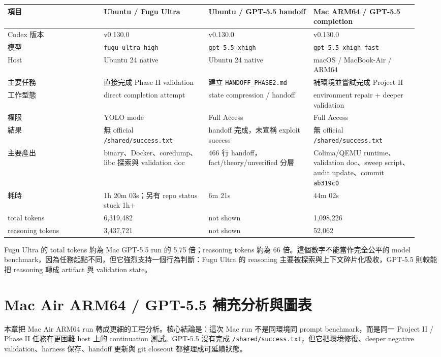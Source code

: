 \documentclass[UTF8,a4paper,11pt]{ctexart}
\newcommand{\code}[1]{\texttt{#1}}
\newcommand{\artifact}[1]{\texttt{#1}}
\begin{document}
\begin{longtable}{L{0.22\linewidth} L{0.24\linewidth} L{0.24\linewidth} L{0.24\linewidth}}
\toprule
項目 & Ubuntu / Fugu Ultra & Ubuntu / GPT-5.5 handoff & Mac ARM64 / GPT-5.5 completion\\
\midrule
Codex 版本 & v0.130.0 & v0.130.0 & v0.130.0\\
模型 & \code{fugu-ultra high} & \code{gpt-5.5 xhigh} & \code{gpt-5.5 xhigh fast}\\
Host & Ubuntu 24 native & Ubuntu 24 native & macOS / MacBook-Air / ARM64\\
主要任務 & 直接完成 Phase II validation & 建立 \artifact{HANDOFF\_PHASE2.md} & 補環境並嘗試完成 Project II\\
工作型態 & direct completion attempt & state compression / handoff & environment repair + deeper validation\\
權限 & YOLO mode & Full Access & Full Access\\
結果 & 無 official \artifact{/shared/success.txt} & handoff 完成，未宣稱 exploit success & 無 official \artifact{/shared/success.txt}\\
主要產出 & binary、Docker、coredump、libc 探索與 validation doc & 466 行 handoff，fact/theory/unverified 分層 & Colima/QEMU runtime、validation doc、sweep script、audit update、commit \code{ab319c0}\\
耗時 & 1h 20m 03s；另有 repo status stuck 1h+ & 6m 21s & 44m 02s\\
total tokens & 6,319,482 & not shown & 1,098,226\\
reasoning tokens & 3,437,721 & not shown & 52,062\\
\bottomrule
\end{longtable}

Fugu Ultra 的 total tokens 約為 Mac GPT-5.5 run 的 5.75 倍；reasoning tokens 約為 66 倍。這個數字不能當作完全公平的 model benchmark，因為任務起點不同，但它強烈支持一個行為判斷：Fugu Ultra 的 reasoning 主要被探索與上下文碎片化吸收，GPT-5.5 則較能把 reasoning 轉成 artifact 與 validation state。

\section{Mac Air ARM64 / GPT-5.5 補充分析與圖表}

本章把 Mac Air ARM64 run 轉成更細的工程分析。核心結論是：這次 Mac run 不是同環境同 prompt benchmark，而是同一 Project II / Phase II 任務在更困難 host 上的 continuation 測試。GPT-5.5 沒有完成 \artifact{/shared/success.txt}，但它把環境修復、deeper negative validation、harness 保存、handoff 更新與 git closeout 都整理成可延續狀態。
\end{document}
